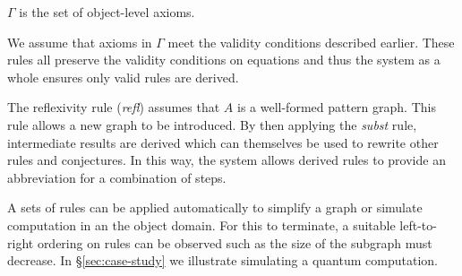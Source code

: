 \documentclass[runningheads]{llncs}
\begin{document}
\noindent $\Gamma$ is the set of object-level axioms. 

We assume that axioms in $\Gamma$ meet the validity conditions
described earlier. These rules all preserve the validity conditions on
equations and thus the system as a whole ensures only valid rules are
derived.

The reflexivity rule (\emph{refl}) assumes that $A$ is a well-formed
pattern graph. This rule allows a new graph to be introduced. By then
applying the \emph{subst} rule, intermediate results are derived which
can themselves be used to rewrite other rules and conjectures.  In
this way, the system allows derived rules to provide an abbreviation
for a combination of steps.

A sets of rules can be applied automatically to simplify a graph or
simulate computation in an the object domain. For this to terminate, a
suitable left-to-right ordering on rules can be observed such as the
size of the subgraph must decrease. In \S\ref{sec:case-study} we
illustrate simulating a quantum computation.





\end{document}
